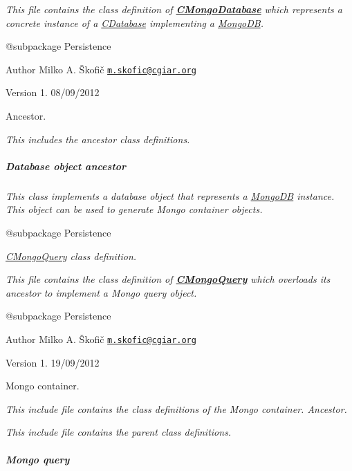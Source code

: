 {\itshape This file contains the class definition of {\bfseries \hyperlink{class_c_mongo_database}{C\-Mongo\-Database}} which represents a concrete instance of a \hyperlink{class_c_database}{C\-Database} implementing a \hyperlink{}{Mongo\-D\-B}.}

{\itshape \begin{DoxyVerb} @subpackage        Persistence
\end{DoxyVerb}
}

{\itshape \begin{DoxyAuthor}{Author}
Milko A. Škofič \href{mailto:m.skofic@cgiar.org}{\tt m.\-skofic@cgiar.\-org} 
\end{DoxyAuthor}
\begin{DoxyVersion}{Version}
1. 08/09/2012
\end{DoxyVersion}
Ancestor.}

{\itshape This includes the ancestor class definitions. \subparagraph*{Database object ancestor}}

{\itshape }

{\itshape This class implements a database object that represents a \hyperlink{}{Mongo\-D\-B} instance. This object can be used to generate Mongo container objects.}

{\itshape \begin{DoxyVerb} @subpackage        Persistence\end{DoxyVerb}
}

{\itshape {\itshape \hyperlink{class_c_mongo_query}{C\-Mongo\-Query}} class definition.}

{\itshape This file contains the class definition of {\bfseries \hyperlink{class_c_mongo_query}{C\-Mongo\-Query}} which overloads its ancestor to implement a Mongo query object.}

{\itshape \begin{DoxyVerb} @subpackage        Persistence
\end{DoxyVerb}
}

{\itshape \begin{DoxyAuthor}{Author}
Milko A. Škofič \href{mailto:m.skofic@cgiar.org}{\tt m.\-skofic@cgiar.\-org} 
\end{DoxyAuthor}
\begin{DoxyVersion}{Version}
1. 19/09/2012
\end{DoxyVersion}
Mongo container.}

{\itshape This include file contains the class definitions of the Mongo container. Ancestor.}

{\itshape This include file contains the parent class definitions. \subparagraph*{Mongo query}}

